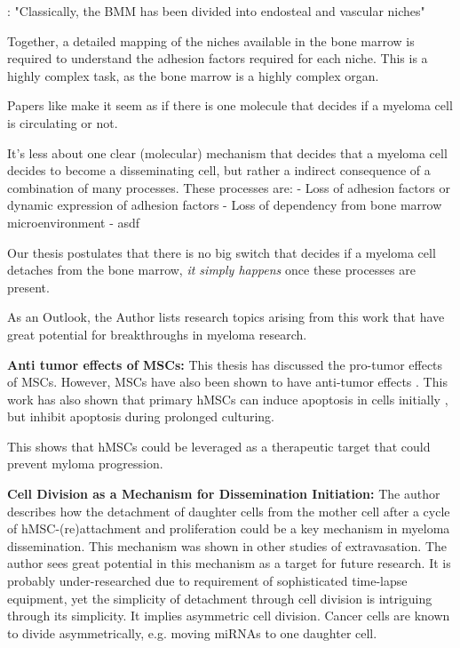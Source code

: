\citet{bouzerdanAdhesionMoleculesMultiple2022}: "Classically, the BMM has been
divided into endosteal and vascular niches"

Together, a detailed mapping of the niches available in the bone marrow is required
to understand the adhesion factors required for each niche. This is a highly
complex task, as the bone marrow is a highly complex organ.



%
\label{sec:discussion_many_small_switches}%

Papers like \citet{akhmetzyanovaDynamicCD138Surface2020} make it seem as if
there is one molecule that decides if a myeloma cell is circulating or not.

It's less about one clear (molecular) mechanism that decides that a myeloma cell
decides to become a disseminating cell, but rather a indirect consequence of a combination of many
processes.
These processes are:
- Loss of adhesion factors or dynamic expression of adhesion factors
- Loss of dependency from bone marrow microenvironment
- asdf

Our thesis postulates that there is no big switch that decides if a myeloma cell
detaches from the bone marrow, \emph{it simply happens} once these processes are
present.


\label{sec:discussion_potential_breakthroughs}
As an Outlook, the Author lists research topics arising from this work that have
great potential for breakthroughs in myeloma research.

\textbf{Anti tumor effects of MSCs:}
This thesis has discussed the pro-tumor effects of MSCs. However, MSCs have also
been shown to have anti-tumor effects \cite{galderisiMyelomaCellsCan2015}. This
work has also shown that primary \acp{hMSC} can induce apoptosis in  cells
initially ,
but inhibit apoptosis during prolonged culturing.

This shows that hMSCs could be leveraged
as a therapeutic target that could prevent myloma progression.




\textbf{Cell Division as a Mechanism for Dissemination Initiation:}
The author describes how the detachment of daughter cells from the mother cell
after a cycle of hMSC-(re)attachment and proliferation could be a key mechanism
in myeloma dissemination. This mechanism was shown in other studies of
extravasation. The author sees great potential in this mechanism as a target for
future research. It is probably under-researched due to requirement of
sophisticated time-lapse equipment, yet the simplicity of detachment through
cell division is intriguing through its simplicity. It implies asymmetric cell
division. Cancer cells are known to divide asymmetrically, e.g. moving miRNAs to
one daughter cell.

